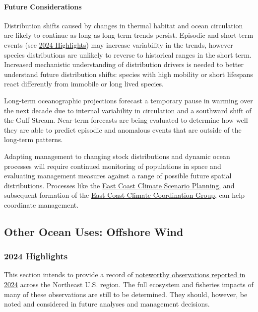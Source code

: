 \documentclass[
  10pt,
]{article}
\begin{document}
\paragraph{Future Considerations}\label{future-considerations}

Distribution shifts caused by changes in thermal habitat and ocean circulation are likely to continue as long as long-term trends persist. Episodic and short-term events (see \hyperref[highlights]{2024 Highlights}) may increase variability in the trends, however species distributions are unlikely to reverse to historical ranges in the short term. Increased mechanistic understanding of distribution drivers is needed to better understand future distribution shifts: species with high mobility or short lifespans react differently from immobile or long lived species.

Long-term oceanographic projections forecast a temporary pause in warming over the next decade due to internal variability in circulation and a southward shift of the Gulf Stream. Near-term forecasts are being evaluated to determine how well they are able to predict episodic and anomalous events that are outside of the long-term patterns.

Adapting management to changing stock distributions and dynamic ocean processes will require continued monitoring of populations in space and evaluating management measures against a range of possible future spatial distributions. Processes like the \href{https://www.mafmc.org/climate-change-scenario-planning}{East Coast Climate Scenario Planning}, and subsequent formation of the \href{https://www.mafmc.org/e3cg}{East Coast Climate Coordination Group}, can help coordinate management.

\subsection{Other Ocean Uses: Offshore Wind}\label{other-ocean-uses-offshore-wind}

\newpage

\subsubsection{2024 Highlights}\label{highlights}

This section intends to provide a record of \href{https://noaa-edab.github.io/catalog/observation_synthesis_2024.html}{noteworthy observations reported in 2024} across the Northeast U.S. region. The full ecosystem and fisheries impacts of many of these observations are still to be determined. They should, however, be noted and considered in future analyses and management decisions.
\end{document}
